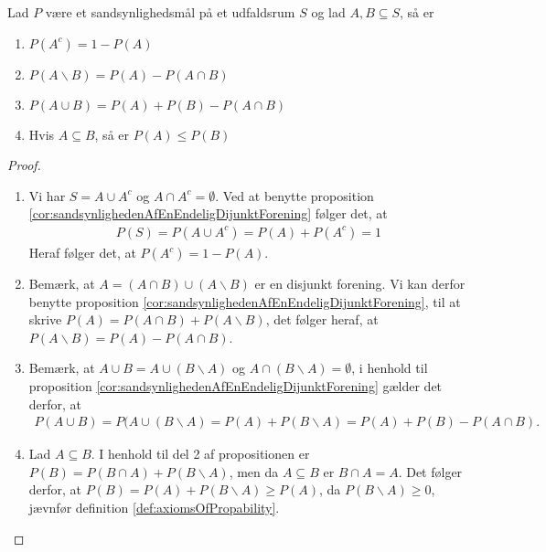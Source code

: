 \begin{prop} \label{prop:sandsynlighedMedToHændelser} %
Lad $P$ være et sandsynlighedsmål på et udfaldsrum $S$ og lad $A, B \subseteq S$, så er 
\begin{enumerate}
    \item $P(A^c) = 1 - P(A)$ \label{enu:propsandsynlighedMedToHændelser1}
    \item $P(A\backslash B) = P(A) - P(A \cap B)$ 
    \item $P(A \cup B) = P(A) + P(B) - P(A \cap B)$ 
    \item Hvis $A \subseteq B$, så er $P(A) \leq P(B)$
\end{enumerate}
\end{prop}
\begin{proof}
\ %
\begin{enumerate}
    \item Vi har $S=A \cup A^c$ og $A \cap A^c=\emptyset$. Ved at benytte proposition \ref{cor:sandsynlighedenAfEnEndeligDijunktForening} følger det, at 
\begin{align*}
    P(S)=P(A \cup A^c) = P(A) + P(A^c) = 1
\end{align*}
Heraf følger det, at $P(A^c) = 1 - P(A)$.
    
    \item Bemærk, at $A = (A \cap B) \cup (A \backslash B)$ er en disjunkt forening. Vi kan derfor benytte proposition \ref{cor:sandsynlighedenAfEnEndeligDijunktForening}, til at skrive
    $P(A) = P(A \cap B) + P(A \backslash B)$, det følger heraf, at $P(A \backslash B) = P(A) - P(A \cap B)$.
    
    \item Bemærk, at $A\cup B=A\cup (B\backslash A)$ og $A\cap (B \backslash A)=\emptyset$, i henhold til proposition \ref{cor:sandsynlighedenAfEnEndeligDijunktForening} gælder det derfor, at
    \begin{align*}
        P(A\cup B) = P(A \cup (B \backslash A) = P(A)+P(B\backslash A)=P(A)+P(B)-P(A\cap B).
    \end{align*}
    
    \item Lad $A \subseteq B$. I henhold til del 2 af propositionen er $P(B) = P(B \cap A) + P(B \backslash A)$, men da $A \subseteq B$ er $B \cap A = A$. Det følger derfor, at $P(B) = P(A) + P(B \backslash A) \geq P(A)$, da $P(B \backslash A) \geq 0$, jævnfør definition \ref{def:axiomsOfPropability}.
\end{enumerate}
\end{proof}


